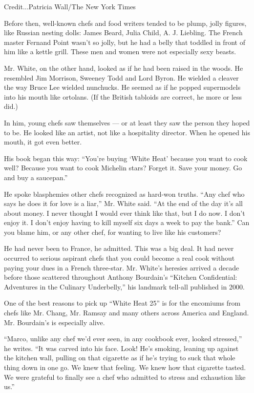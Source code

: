 Credit...Patricia Wall/The New York Times

Before then, well-known chefs and food writers tended to be plump, jolly
figures, like Russian nesting dolls: James Beard, Julia Child, A. J.
Liebling. The French master Fernand Point wasn't so jolly, but he had a
belly that toddled in front of him like a kettle grill. These men and
women were not especially sexy beasts.

Mr. White, on the other hand, looked as if he had been raised in the
woods. He resembled Jim Morrison, Sweeney Todd and Lord Byron. He
wielded a cleaver the way Bruce Lee wielded nunchucks. He seemed as if
he popped supermodels into his mouth like ortolans. (If the British
tabloids are correct, he more or less did.)

In him, young chefs saw themselves --- or at least they saw the person
they hoped to be. He looked like an artist, not like a hospitality
director. When he opened his mouth, it got even better.

His book began this way: ``You're buying `White Heat' because you want
to cook well? Because you want to cook Michelin stars? Forget it. Save
your money. Go and buy a saucepan.''

He spoke blasphemies other chefs recognized as hard-won truths. ``Any
chef who says he does it for love is a liar,'' Mr. White said. ``At the
end of the day it's all about money. I never thought I would ever think
like that, but I do now. I don't enjoy it. I don't enjoy having to kill
myself six days a week to pay the bank.'' Can you blame him, or any
other chef, for wanting to live like his customers?

He had never been to France, he admitted. This was a big deal. It had
never occurred to serious aspirant chefs that you could become a real
cook without paying your dues in a French three-star. Mr. White's
heresies arrived a decade before those scattered throughout Anthony
Bourdain's ``Kitchen Confidential: Adventures in the Culinary
Underbelly,'' his landmark tell-all published in 2000.

One of the best reasons to pick up ``White Heat 25'' is for the
encomiums from chefs like Mr. Chang, Mr. Ramsay and many others across
America and England. Mr. Bourdain's is especially alive.

``Marco, unlike any chef we'd ever seen, in any cookbook ever, looked
stressed,'' he writes. ``It was carved into his face. Look! He's
smoking, leaning up against the kitchen wall, pulling on that cigarette
as if he's trying to suck that whole thing down in one go. We knew that
feeling. We knew how that cigarette tasted. We were grateful to finally
see a chef who admitted to stress and exhaustion like us.''


